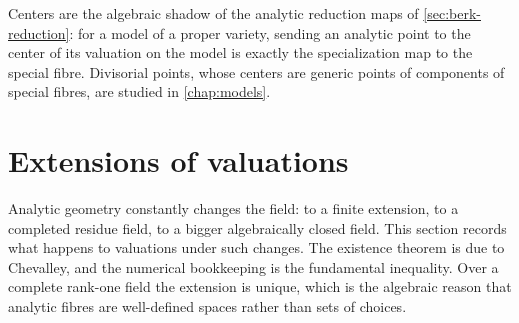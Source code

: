 Centers are the algebraic shadow of the analytic reduction maps of
\cref{sec:berk-reduction}: for a model of a proper variety, sending an
analytic point to the center of its valuation on the model is exactly the
specialization map to the special fibre. Divisorial points, whose centers
are generic points of components of special fibres, are studied in
\cref{chap:models}.

\section{Extensions of valuations}
\label{sec:extension-of-valuations}

Analytic geometry constantly changes the field: to a finite extension, to
a completed residue field, to a bigger algebraically closed field. This
section records what happens to valuations under such changes. The
existence theorem is due to Chevalley, and the numerical bookkeeping is
the fundamental inequality. Over a complete rank-one field the extension
is unique, which is the algebraic reason that analytic fibres are
well-defined spaces rather than sets of choices.


